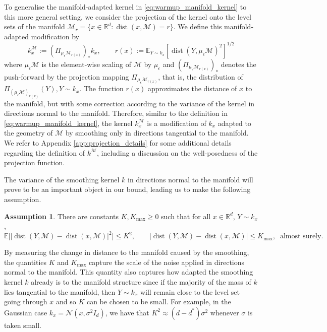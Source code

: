 \documentclass[10pt]{article}
\theoremstyle{plain}
\theoremstyle{definition}
\newtheorem{assumption}[theorem]{Assumption}
\theoremstyle{remark}
\newcommand{\M}{{\mathcal{M}}}
\newcommand{\R}{\mathbb{R}}
\newcommand{\E}{\mathbb{E}}
\newcommand{\dist}{\operatorname{dist}}
\begin{document}
To generalise the manifold-adapted kernel in \eqref{eq:warmup_manifold_kernel} to this more general setting, we consider the projection of the kernel onto the level sets of the manifold \(\M_r = \{x \in \R^d: \dist(x, \M) = r\}\). We define this manifold-adapted modification by
\begin{equation}\label{eq:man_adapt_curved}
    k^\M_x := ( \Pi_{\mu_\epsilon \M_{r(x)}} )_* k_x, \qquad r(x) := \E_{Y \sim k_x}[\dist(Y, \mu_\epsilon \M)^2]^{1/2}
\end{equation}
where \(\mu_\epsilon \M\) is the element-wise scaling of \(\M\) by \(\mu_\epsilon\) and \((\Pi_{\mu_\epsilon \M_{r(x)}})_*\) denotes the push-forward by the projection mapping \(\Pi_{\mu_\epsilon \M_{r(x)}}\), that is, the distribution of \(\Pi_{(\mu_\epsilon \M)_{r(x)}}(Y), Y \sim k_x\). The function \(r(x)\) approximates the distance of \(x\) to the manifold, but with some correction according to the variance of the kernel in directions normal to the manifold. Therefore, similar to the definition in \eqref{eq:warmup_manifold_kernel}, the kernel \(k^\M_x\) is a modification of \(k_x\) adapted to the geometry of \(\M\) by smoothing only in directions tangential to the manifold. We refer to Appendix \ref{app:projection_details} for some additional details regarding the definition of \(k^\M\), including a discussion on the well-posedness of the projection function.

The variance of the smoothing kernel \(k\) in directions normal to the manifold will prove to be an important object in our bound, leading us to make the following assumption.
\begin{assumption}\label{ass:sg_smooth}
There are constants \(K, K_{\max} \geq 0\) such that for all \(x \in \R^d\), \(Y \sim k_x\),
\begin{equation*}
    \E \big [ | \dist(Y, \M) - \dist(x, \M) |^2 \big ] \leq K^2, \qquad | \dist(Y, \M) - \dist(x, \M) | \leq K_{\max}, \ \text{ almost surely.}
\end{equation*}
\end{assumption}
By measuring the change in distance to the manifold caused by the smoothing, the quantities \(K\) and \(K_{\max}\) capture the scale of the noise applied in directions normal to the manifold. This quantity also captures how adapted the smoothing kernel \(k\) already is to the manifold structure since if the majority of the mass of \(k\) lies tangential to the manifold, then \(Y \sim k_x\) will remain close to the level set going through \(x\) and so \(K\) can be chosen to be small. For example, in the Gaussian case \(k_x = \mathcal{N}(x, \sigma^2 I_d)\), we have that \(K^2 \approx (d-d^*) \sigma^2\) whenever \(\sigma\) is taken small.
\end{document}
